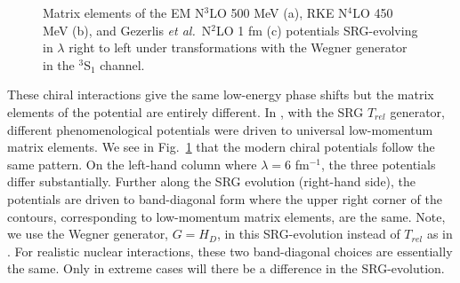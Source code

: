 \documentclass[preprintnumbers,floatfix,aps,prc,preprint,nofootinbib]{revtex4-1}
\begin{document}
\begin{figure}[H]
	\centering
	

	\caption{Matrix elements of the EM N$^3$LO 500 MeV (a), RKE N$^4$LO 450 MeV (b), and Gezerlis \textit{et al.}~N$^2$LO 1 fm (c) potentials SRG-evolving in $\lambda$ right to left under transformations with the Wegner generator in the $^3$S$_1$ channel.}
	\label{fig:potential_contours_3S1_Wegner}
\end{figure}
%
These chiral interactions give the same low-energy phase shifts but the matrix elements of the potential are entirely different. In \cite{Dainton:2013axa}, with the SRG $T_{rel}$ generator, different phenomenological potentials were driven to universal low-momentum matrix elements. We see in Fig.~\ref{fig:potential_contours_3S1_Wegner} that the modern chiral potentials follow the same pattern. On the left-hand column where $\lambda=6$ fm$^{-1}$, the three potentials differ substantially. Further along the SRG evolution (right-hand side), the potentials are driven to band-diagonal form where the upper right corner of the contours, corresponding to low-momentum matrix elements, are the same. Note, we use the Wegner generator, $G=H_D$, in this SRG-evolution instead of $T_{rel}$ as in \cite{Dainton:2013axa}. For realistic nuclear interactions, these two band-diagonal choices are essentially the same. Only in extreme cases will there be a difference in the SRG-evolution.
\end{document}
